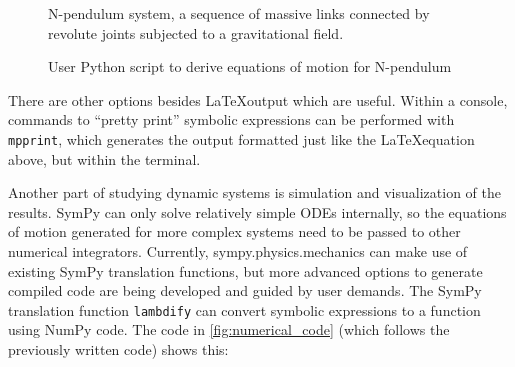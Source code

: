 \documentclass[twocolumn,10pt]{asme2e}
\newcommand{\drawpendulum}[6]{
  \def \x {#1}
  \def \y {#2}
  \def \theta {#3}
  \def \length {#4}
  \def \m {#5}
  \def \index {#6}
  \pgftransformshift{\pgfpoint{\x}{\y}}
  \draw[dashed] (0,0)--(0,-\length);
  \draw[->] (0,-0.75*\length) arc (-90:\theta-90:0.75*\length);
  \pgftransformrotate{\theta/2}
  \node at (0,-0.90*\length) {$q_{\scriptscriptstyle\index}$};
  \pgftransformrotate{\theta/2}
  \draw [thick] (0,0)--(0,-\length);
  \draw[snake=brace] (\m+1mm,0)--(\m+1mm,-\length);
  \node at (\m+6mm,-0.5*\length) {$l_{\scriptscriptstyle\index}$};
  \shade[ball color=black] (0,-\length) circle (\m);
  \pgftransformshift{\pgfpoint{0}{-\length}}
  \pgftransformrotate{-\theta}
  \node at (-\m/2-2mm, -\m/2-2mm) {$m_{\scriptscriptstyle\index}$};
  \pgftransformrotate{\theta}
  \pgftransformshift{\pgfpoint{0}{\length}}

  \pgftransformrotate{-\theta}
  \pgftransformshift{\pgfpoint{-\x}{-\y}}
}
\begin{document}
\begin{figure}
\begin{center}
\end{center}
\caption{N-pendulum system, a sequence of massive links connected by revolute
joints subjected to a gravitational field.}
\label{fig:n_pendulum}
\end{figure}

\begin{figure}
\caption{User Python script to derive equations of motion for N-pendulum}
\label{fig:n_pendulum_source}
\end{figure}

There are other options besides \LaTeX output which are useful. Within a
console, commands to ``pretty print'' symbolic expressions can be performed
with \verb|mpprint|, which generates the output formatted just like the
\LaTeX equation above, but within the terminal.

Another part of studying dynamic systems is simulation and visualization of the
results. SymPy can only solve relatively simple ODEs internally, so the
equations of motion generated for more complex systems need to be passed to
other numerical integrators. Currently, sympy.physics.mechanics can make use
of existing SymPy translation functions, but more advanced options to generate
compiled code are being developed and guided by user demands. The SymPy
translation function \verb|lambdify| can convert symbolic expressions to a
function using NumPy code. The code in \ref{fig:numerical_code} (which follows
the previously written code) shows this:
\end{document}

